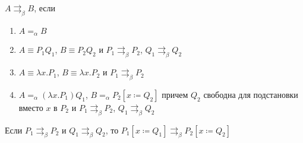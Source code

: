 \newcommand{\bpar}{\rightrightarrows_{\beta}}

\begin{definition}
	$A\bpar B$, если
	\begin{enumerate}
		\item $A=_{\alpha}B$
		\item $A\equiv{}P_{1}Q_{1}$, $B\equiv{}P_{2}Q_{2}$ и $P_{1}\bpar P_{2}$, $Q_{1}\bpar Q_{2}$
		\item $A\equiv{}\lambda{}x.P_{1}$, $B\equiv{}\lambda{}x.P_{2}$ и 
		$P_{1}\bpar P_{2}$
		\item $A=_{\alpha}(\lambda{}x.P_1)Q_1$, $B=_{\alpha}P_2[x\coloneqq{}Q_2]$ причем $Q_2$ свободна для подстановки вместо $x$ в $P_2$ и $P_1 \bpar P_2$, $Q_1 \bpar Q_2$
	\end{enumerate}
\end{definition}

\begin{lemma}
	\label{bparhelp}
	Если $P_{1}\bpar P_{2}$ и $Q_{1}\bpar Q_{2}$, то $P_{1}[x\coloneqq{}Q_{1}]\bpar P_{2}[x\coloneqq{}Q_{2}]$
\end{lemma}

